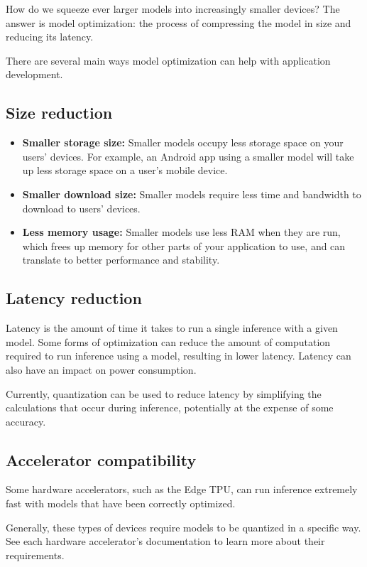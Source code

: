 How do we squeeze ever larger models into increasingly smaller devices? The answer is model optimization: the process of compressing the model in size and reducing its latency. \cite{datascienceModelOptimization:2024}

There are several main ways model optimization can help with application development. \cite{tfl_Opt:2024}

\subsection{Size reduction}
\begin{itemize}
	\item \textbf{Smaller storage size:} Smaller models occupy less storage space on your users' devices. For example, an Android app using a smaller model will take up less storage space on a user's mobile device.
	\item \textbf{Smaller download size:} Smaller models require less time and bandwidth to download to users' devices.
	\item \textbf{Less memory usage:} Smaller models use less RAM when they are run, which frees up memory for other parts of your application to use, and can translate to better performance and stability. \cite{tfl_Opt:2024}
\end{itemize}

\subsection{Latency reduction}
Latency is the amount of time it takes to run a single inference with a given model. Some forms of optimization can reduce the amount of computation required to run inference using a model, resulting in lower latency. Latency can also have an impact on power consumption.

Currently, quantization can be used to reduce latency by simplifying the calculations that occur during inference, potentially at the expense of some accuracy. \cite{tfl_Opt:2024}

\subsection{Accelerator compatibility}
Some hardware accelerators, such as the Edge TPU, can run inference extremely fast with models that have been correctly optimized.

Generally, these types of devices require models to be quantized in a specific way. See each hardware accelerator's documentation to learn more about their requirements. \cite{tfl_Opt:2024}

